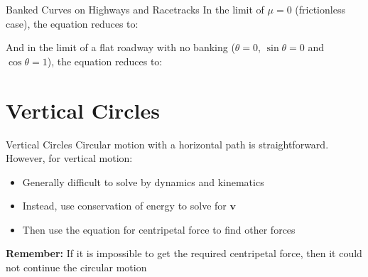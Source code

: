 \documentclass[12pt,compress,aspectratio=169]{beamer}
\newcommand{\eq}[2]{\vspace{#1}{\Large\begin{displaymath}#2\end{displaymath}}}
\begin{document}
\begin{frame}{Banked Curves on Highways and Racetracks}
  In the limit of $\mu=0$ (frictionless case), the equation reduces to:

  \eq{-.1in}{
    \boxed{ v_{\text{max}}=\sqrt{rg\tan\theta} }
  }

  And in the limit of a flat roadway with no banking ($\theta=0$,
  $\sin\theta=0$ and $\cos\theta=1$), the equation reduces to:

  \eq{-.2in}{
    \boxed{
      v_{\text{max}}=\sqrt{\mu rg}
    }
  }
\end{frame}




%
%


\section{Vertical Circles}

\begin{frame}{Vertical Circles}
  Circular motion with a horizontal path is straightforward. However, for
  vertical motion:
  \begin{itemize}
  \item Generally difficult to solve by dynamics and kinematics
  \item Instead, use conservation of energy to solve for $\bm{v}$
  \item Then use the equation for centripetal force to find other forces
  \end{itemize}

  \textbf{Remember:} If it is impossible to get the required centripetal
  force, then it could not continue the circular motion
\end{frame}
\end{document}
